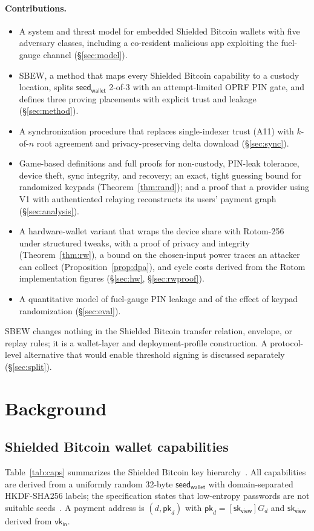 \documentclass[11pt]{article}
\theoremstyle{remark}
\newcommand{\sk}{\mathsf{sk}}
\newcommand{\vk}{\mathsf{vk}}
\newcommand{\seed}{\mathsf{seed}_{\mathsf{wallet}}}
\newcommand{\SB}{Shielded Bitcoin}
\newcommand{\sysname}{\textsf{SBEW}}
\begin{document}
\paragraph{Contributions.}
\begin{itemize}
  \item A system and threat model for embedded \SB{} wallets with five adversary classes, including a co-resident malicious app exploiting the fuel-gauge channel (§\ref{sec:model}).
  \item \sysname{}, a method that maps every \SB{} capability to a custody location, splits $\seed$ 2-of-3 with an attempt-limited OPRF PIN gate, and defines three proving placements with explicit trust and leakage (§\ref{sec:method}).
  \item A synchronization procedure that replaces single-indexer trust (A11) with $k$-of-$n$ root agreement and privacy-preserving delta download (§\ref{sec:sync}).
  \item Game-based definitions and full proofs for non-custody, PIN-leak tolerance, device theft, sync integrity, and recovery; an exact, tight guessing bound for randomized keypads (Theorem~\ref{thm:rand}); and a proof that a provider using V1 with authenticated relaying reconstructs its users' payment graph (§\ref{sec:analysis}).
  \item A hardware-wallet variant that wraps the device share with Rotom-256~\cite{rotom26} under structured tweaks, with a proof of privacy and integrity (Theorem~\ref{thm:rw}), a bound on the chosen-input power traces an attacker can collect (Proposition~\ref{prop:dpa}), and cycle costs derived from the Rotom implementation figures (§\ref{sec:hw}, §\ref{sec:rwproof}).
  \item A quantitative model of fuel-gauge PIN leakage and of the effect of keypad randomization (§\ref{sec:eval}).
\end{itemize}
\sysname{} changes nothing in the \SB{} transfer relation, envelope, or replay rules; it is a wallet-layer and deployment-profile construction. A protocol-level alternative that would enable threshold signing is discussed separately (§\ref{sec:split}).

\section{Background}
\label{sec:bg}

\subsection{\SB{} wallet capabilities}
Table~\ref{tab:caps} summarizes the \SB{} key hierarchy~\cite[Table~1]{sb26}. All capabilities are derived from a uniformly random 32-byte $\seed$ with domain-separated HKDF-SHA256 labels; the specification states that low-entropy passwords are not suitable seeds~\cite[App.~A.2]{sb26}. A payment address is $(d, \mathsf{pk}_d)$ with $\mathsf{pk}_d = [\sk_{\mathsf{view}}]G_d$ and $\sk_{\mathsf{view}}$ derived from $\vk_{\mathsf{in}}$.
\end{document}
